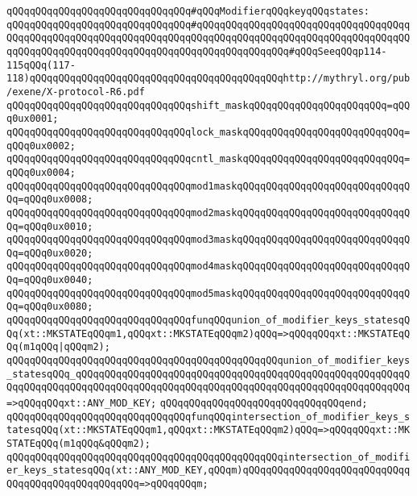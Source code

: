 \newline
\verb|qQQqqQQqqQQqqQQqqQQqqQQqqQQqqQQq#qQQqModifierqQQqkeyqQQqstates:|\newline
\verb|qQQqqQQqqQQqqQQqqQQqqQQqqQQqqQQq#qQQqqQQqqQQqqQQqqQQqqQQqqQQqqQQqqQQqqQQqqQQqqQQqqQQqqQQqqQQqqQQqqQQqqQQqqQQqqQQqqQQqqQQqqQQqqQQqqQQqqQQqqQQqqQQqqQQqqQQqqQQqqQQqqQQqqQQqqQQqqQQqqQQqqQQqqQQq#qQQqSeeqQQqp114-115qQQq(117-118)qQQqqQQqqQQqqQQqqQQqqQQqqQQqqQQqqQQqqQQqqQQqhttp://mythryl.org/pub/exene/X-protocol-R6.pdf|\newline
\verb|qQQqqQQqqQQqqQQqqQQqqQQqqQQqqQQqshift_maskqQQqqQQqqQQqqQQqqQQqqQQq=qQQq0ux0001;|\newline
\verb|qQQqqQQqqQQqqQQqqQQqqQQqqQQqqQQqlock_maskqQQqqQQqqQQqqQQqqQQqqQQqqQQq=qQQq0ux0002;|\newline
\verb|qQQqqQQqqQQqqQQqqQQqqQQqqQQqqQQqcntl_maskqQQqqQQqqQQqqQQqqQQqqQQqqQQq=qQQq0ux0004;|\newline
\verb|qQQqqQQqqQQqqQQqqQQqqQQqqQQqqQQqmod1maskqQQqqQQqqQQqqQQqqQQqqQQqqQQqqQQq=qQQq0ux0008;|\newline
\verb|qQQqqQQqqQQqqQQqqQQqqQQqqQQqqQQqmod2maskqQQqqQQqqQQqqQQqqQQqqQQqqQQqqQQq=qQQq0ux0010;|\newline
\verb|qQQqqQQqqQQqqQQqqQQqqQQqqQQqqQQqmod3maskqQQqqQQqqQQqqQQqqQQqqQQqqQQqqQQq=qQQq0ux0020;|\newline
\verb|qQQqqQQqqQQqqQQqqQQqqQQqqQQqqQQqmod4maskqQQqqQQqqQQqqQQqqQQqqQQqqQQqqQQq=qQQq0ux0040;|\newline
\verb|qQQqqQQqqQQqqQQqqQQqqQQqqQQqqQQqmod5maskqQQqqQQqqQQqqQQqqQQqqQQqqQQqqQQq=qQQq0ux0080;|\newline
\newline
\verb|qQQqqQQqqQQqqQQqqQQqqQQqqQQqqQQqfunqQQqunion_of_modifier_keys_statesqQQq(xt::MKSTATEqQQqm1,qQQqxt::MKSTATEqQQqm2)qQQq=>qQQqqQQqxt::MKSTATEqQQq(m1qQQq|\verb#|qQQqm2);#\newline
\verb|qQQqqQQqqQQqqQQqqQQqqQQqqQQqqQQqqQQqqQQqqQQqqQQqunion_of_modifier_keys_statesqQQq_qQQqqQQqqQQqqQQqqQQqqQQqqQQqqQQqqQQqqQQqqQQqqQQqqQQqqQQqqQQqqQQqqQQqqQQqqQQqqQQqqQQqqQQqqQQqqQQqqQQqqQQqqQQqqQQqqQQqqQQqqQQqqQQq=>qQQqqQQqxt::ANY_MOD_KEY;|\newline
\verb|qQQqqQQqqQQqqQQqqQQqqQQqqQQqqQQqend;|\newline
\newline
\verb|qQQqqQQqqQQqqQQqqQQqqQQqqQQqqQQqfunqQQqintersection_of_modifier_keys_statesqQQq(xt::MKSTATEqQQqm1,qQQqxt::MKSTATEqQQqm2)qQQq=>qQQqqQQqxt::MKSTATEqQQq(m1qQQq&qQQqm2);|\newline
\verb|qQQqqQQqqQQqqQQqqQQqqQQqqQQqqQQqqQQqqQQqqQQqqQQqintersection_of_modifier_keys_statesqQQq(xt::ANY_MOD_KEY,qQQqm)qQQqqQQqqQQqqQQqqQQqqQQqqQQqqQQqqQQqqQQqqQQqqQQqqQQq=>qQQqqQQqm;|\newline
